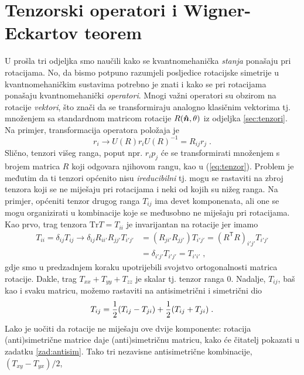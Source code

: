\section{Tenzorski operatori i Wigner-Eckartov teorem}
\label{sect:tenzorskioperatori}

U prošla tri odjeljka smo naučili kako se kvantnomehanička \emph{stanja}
ponašaju pri rotacijama.
No, da bismo potpuno razumjeli posljedice rotacijske simetrije u
kvantnomehaničkim sustavima
potrebno je znati i kako se pri rotacijama ponašaju kvantnomehanički
\emph{operatori}. Mnogi važni operatori su obzirom na rotacije \emph{vektori},
što znači da se transformiraju analogno klasičnim vektorima tj. množenjem
sa standardnom matricom rotacije $R(\unitn, \theta)$ iz odjeljka
\ref{sec:tenzori}. Na primjer, transformacija operatora položaja je
\begin{equation}
    r_i \longrightarrow U(R) r_i U(R)^{-1} = R_{ij} r_j \;.
\end{equation}
Slično, tenzori višeg ranga, poput npr. $r_i p_j$ će se transformirati
množenjem s brojem matrica $R$ koji odgovara njihovom rangu, kao
u (\ref{eq:tenzor}). Problem je međutim da ti tenzori općenito nisu
\emph{ireducibilni} tj. mogu se rastaviti na zbroj tenzora
koji se ne miješaju pri rotacijama i neki od kojih su
nižeg ranga. Na primjer, općeniti tenzor drugog ranga $T_{ij}$ ima
devet komponenata, ali one se mogu organizirati u kombinacije
koje se međusobno ne miješaju pri rotacijama. 
Kao prvo, trag tenzora $\mathrm{Tr} T = T_{ii}$ je invarijantan
na rotacije jer imamo
\begin{align*}
 T_{ii} = \delta_{ij} T_{ij} \longrightarrow
\delta_{ij} R_{i i'} R_{j j'} T_{i' j'}& = (R_{j i'} R_{j j'}) T_{i' j'}
= (R^{\mathsf{T}} R)_{i' j'} T_{i' j'} \\
& = \delta_{i' j'} T_{i' j'} = T_{i' i'} \;,
\end{align*}
gdje smo u predzadnjem koraku upotrijebili svojstvo ortogonalnosti
matrica rotacije. Dakle, trag 
 $T_{xx} + T_{yy} + T_{zz}$ je skalar tj. tenzor ranga 0.
Nadalje, $T_{ij}$, baš kao i svaku matricu, možemo
rastaviti na antisimetrični i simetrični dio
\begin{equation}
  T_{ij} = \frac{1}{2} (T_{ij} - T_{ji}) + \frac{1}{2} (T_{ij} + T_{ji}) \;.
\label{eq:SplA}
\end{equation}
Lako je uočiti da rotacije ne miješaju ove dvije komponente:
rotacija (anti)si\-met\-ri\-čne matrice daje (anti)simetričnu matricu,
kako će čitatelj pokazati u zadatku \ref{zad:antisim}.
Tako tri nezavisne antisimetrične kombinacije, $(T_{xy}-T_{yx})/2$,
